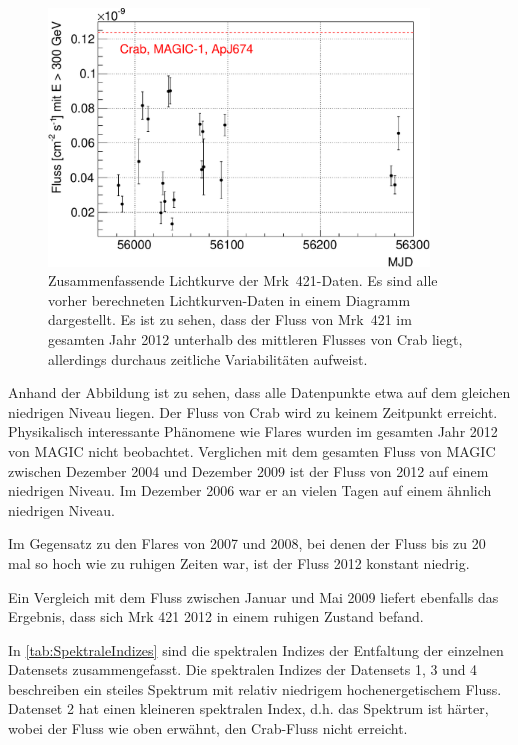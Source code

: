 \begin{figure}
    \centering
    \includegraphics[width=0.9\textwidth]{./Plots/04_MrkAnalyse/Alles_LC.pdf}
    \caption{Zusammenfassende Lichtkurve der Mrk~421-Daten.
    Es sind alle vorher berechneten Lichtkurven-Daten in einem Diagramm dargestellt. 
    Es ist zu sehen, dass der Fluss von Mrk~421 im gesamten Jahr 2012 unterhalb des mittleren Flusses von Crab liegt, allerdings durchaus zeitliche Variabilitäten aufweist.}
    \label{Alles_LC_Mrk421}
\end{figure}

Anhand der Abbildung ist zu sehen, dass alle Datenpunkte etwa auf dem gleichen niedrigen Niveau liegen.
Der Fluss von Crab wird zu keinem Zeitpunkt erreicht.
Physikalisch interessante Phänomene wie Flares wurden im gesamten Jahr 2012 von MAGIC nicht beobachtet.
Verglichen mit dem gesamten Fluss von MAGIC zwischen Dezember 2004 und Dezember 2009 \cite{DissBackes} ist der Fluss von 2012 auf einem niedrigen Niveau.
Im Dezember 2006 war er an vielen Tagen auf einem ähnlich niedrigen Niveau.

Im Gegensatz zu den Flares von 2007 und 2008, bei denen der Fluss bis zu 20 mal so hoch wie zu ruhigen Zeiten \cite{DissBackes}  war, ist der Fluss 2012 konstant niedrig.

Ein Vergleich mit dem Fluss zwischen Januar und Mai 2009 \cite{DissDiego} liefert ebenfalls das Ergebnis, dass sich Mrk 421 2012 in einem ruhigen Zustand befand.

In \autoref{tab:SpektraleIndizes} sind die spektralen Indizes der Entfaltung der einzelnen Datensets zusammengefasst.
Die spektralen Indizes der Datensets 1, 3 und 4 beschreiben ein steiles Spektrum mit relativ niedrigem hochenergetischem Fluss.
Datenset 2 hat einen kleineren spektralen Index, d.h. das Spektrum ist härter, wobei der Fluss wie oben erwähnt, den Crab-Fluss nicht erreicht.


